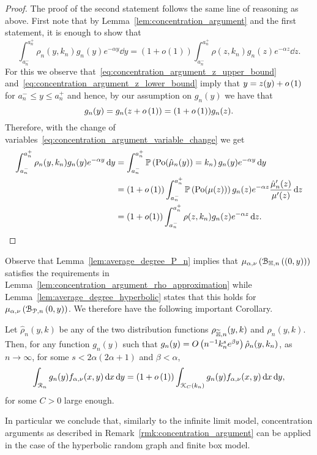 \begin{proof}
The proof of the second statement follows the same line of reasoning as above. First note that by Lemma~\ref{lem:concentration_argument} and the first statement, it is enough to show that
\[
	\int_{a_n^-}^{a_n^+} \rho_n(y,k_n) g_n(y) e^{-\alpha y} \dd y
	= \left(1 + o(1)\right) \int_{a_n^-}^{a_n^+} \rho(z,k_n) g_n(z) e^{-\alpha z} \dd z.
\] 
For this we observe that~\eqref{eq:concentration_argument_z_upper_bound} and~\eqref{eq:concentration_argument_z_lower_bound} imply that $y = z(y) + o\left(1\right)$ for $a_n^- \le y \le a_n^+$ and hence, by our assumption on $g_n(y)$ we have that
\[
	g_n(y) = g_n(z + o\left(1\right)) = (1 + o\left(1\right))g_n(z).
\]
Therefore, with the change of variables~\eqref{eq:concentration_argument_variable_change} we get
\begin{align*}
	\int_{a_n^-}^{a_n^+} \rho_n(y,k_n) g_n(y) e^{-\alpha y} \operatorname{\mathrm{d}\hspace{-2pt}} y
	&=  \int_{a_n^-}^{a_n^+} \mathbb{P}\left({\mathrm{Po}}(\hat{\mu}_n(y)) = k_n\right) g_n(y) e^{-\alpha y} \operatorname{\mathrm{d}\hspace{-2pt}} y\\
	&= (1 + o\left(1\right))\int_{a_n^-}^{a_n^+}  \mathbb{P}\left({\mathrm{Po}}(\mu(z))\right)
		g_n(z) e^{-\alpha z} \frac{\hat{\mu}_n^\prime(z)}{\mu^{\prime}(z)} \operatorname{\mathrm{d}\hspace{-2pt}} z\\
	&= \left(1 + o(1)\right) \int_{a_n^-}^{a_n^+} \rho(z,k_n) g_n(z) e^{-\alpha z} \operatorname{\mathrm{d}\hspace{-2pt}} z.
\end{align*}

\end{proof}

Observe that Lemma~\ref{lem:average_degree_P_n} implies that $\mu_{\alpha,\nu}\left({\mathcal B}_{\mathbb{H},n}\left((0,y)\right)\right)$ satisfies the requirements in Lemma~\ref{lem:concentration_argument_rho_approximation} while Lemma~\ref{lem:average_degree_hyperbolic} states that this holds for $\mu_{\alpha,\nu}\left({\mathcal B}_{{\mathcal P},n}\left(0,y\right)\right)$. We therefore have the following important Corollary.

\begin{corollary}\label{cor:concentration_argument_other_models}
Let $\hat{\rho}_n(y,k)$ be any of the two distribution functions $\rho_{\widetilde{\mathbb{H}},n}(y,k)$ and $\rho_{n}(y,k)$. Then, for any function $g_n(y)$ such that $g_n(y) = O\left(n^{-1} k_n^{s} e^{\beta y}\right)\hat{\rho}_n(y,k_n)$, as $n \to \infty$, for some $s < 2\alpha(2\alpha + 1)$ and $\beta < \alpha$,
\[
	\int_{{\mathcal R}_n} g_n(y) f_{\alpha,\nu}(x,y) \operatorname{\mathrm{d}\hspace{-2pt}} x \operatorname{\mathrm{d}\hspace{-2pt}} y
	= (1+o\left(1\right))\int_{{\mathcal K}_C(k_n)} g_n(y) f_{\alpha,\nu}(x,y) \operatorname{\mathrm{d}\hspace{-2pt}} x \operatorname{\mathrm{d}\hspace{-2pt}} y,
\]
for some $C > 0$ large enough.
\end{corollary}

In particular we conclude that, similarly to the infinite limit model, concentration arguments as described in Remark~\ref{rmk:concentration_argument} can be applied in the case of the hyperbolic random graph and finite box model.


